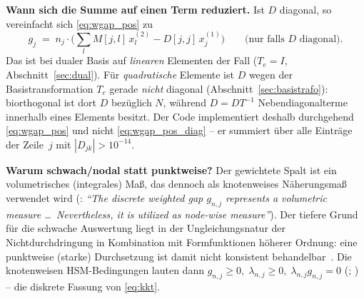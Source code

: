 \documentclass[a4paper,11pt]{article}
\def\bm#1{#1}%
\def\tilde#1{#1}%
\begin{document}
\medskip
\noindent\textbf{Wann sich die Summe auf einen Term reduziert.} Ist $\bm D$ diagonal, so
vereinfacht sich \eqref{eq:wgap_pos} zu
\begin{equation}
\tilde g_{j} \;=\; \bm n_j\!\cdot\!\Big(\sum_l \bm M[j,l]\,\bm x_l^{(2)}
- \bm D[j,j]\,\bm x_j^{(1)}\Big)
\qquad\text{(nur falls } \bm D \text{ diagonal)} .
\label{eq:wgap_pos_diag}
\end{equation}
Das ist bei dualer Basis auf \emph{linearen} Elementen der Fall ($\bm T_e=\bm I$,
Abschnitt~\ref{sec:dual}). Für \emph{quadratische} Elemente ist $\bm D$ wegen der
Basistransformation $\bm T_e$ gerade \emph{nicht} diagonal (Abschnitt~\ref{sec:basistrafo}):
biorthogonal ist dort $\tilde{\bm D}$ bezüglich $\tilde{\bm N}$, während
$\bm D=\tilde{\bm D}\bm T^{-1}$ Nebendiagonalterme innerhalb eines Elements besitzt. Der Code
implementiert deshalb durchgehend \eqref{eq:wgap_pos} und nicht \eqref{eq:wgap_pos_diag} --
er summiert über alle Einträge der Zeile~$j$ mit $|D_{jk}|>10^{-14}$.

\medskip
\noindent\textbf{Warum schwach/nodal statt punktweise?} Der gewichtete Spalt ist ein volumetrisches
(integrales) Maß, das dennoch als knotenweises Näherungsmaß verwendet wird
(\citealp{farah}: \emph{``The discrete weighted gap $\tilde g_{n,j}$ represents a volumetric measure
\ldots\ Nevertheless, it is utilized as node-wise measure''}). Der tiefere Grund für die schwache
Auswertung liegt in der Ungleichungsnatur der Nichtdurchdringung in Kombination mit
Formfunktionen höherer Ordnung: eine punktweise (starke) Durchsetzung ist damit nicht konsistent
behandelbar~\citep[S.~B429]{popp2012}. Die knotenweisen HSM-Bedingungen lauten dann
$\tilde g_{n,j}\ge0,\; \lambda_{n,j}\ge0,\; \lambda_{n,j}\tilde g_{n,j}=0$
(\citealp[Gl.~(3.7)]{popp2012}; \citealp[Gl.~(3.41)]{farah}) -- die diskrete Fassung von \eqref{eq:kkt}.
\end{document}
